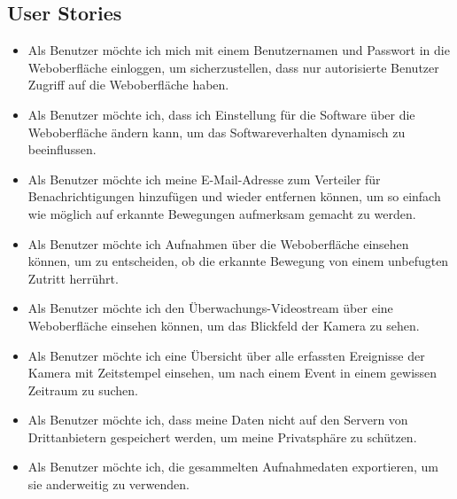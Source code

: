 \subsection{User Stories}
\begin{itemize}
\item
Als Benutzer möchte ich mich mit einem Benutzernamen und Passwort in die Weboberfläche einloggen, um sicherzustellen, dass nur autorisierte Benutzer Zugriff auf die Weboberfläche haben.
\item
Als Benutzer möchte ich, dass ich Einstellung für die Software über die Weboberfläche ändern kann, um das Softwareverhalten dynamisch zu beeinflussen.
\item
Als Benutzer möchte ich meine E-Mail-Adresse zum Verteiler für Benachrichtigungen hinzufügen und wieder entfernen können, um so einfach wie möglich auf erkannte Bewegungen aufmerksam gemacht zu werden.
\item
Als Benutzer möchte ich Aufnahmen über die Weboberfläche einsehen können, um zu entscheiden, ob die erkannte Bewegung von einem unbefugten Zutritt herrührt.
\item
Als Benutzer möchte ich den Überwachungs-Videostream über eine Weboberfläche einsehen können, um das Blickfeld der Kamera zu sehen.
\item
Als Benutzer möchte ich eine Übersicht über alle erfassten Ereignisse der Kamera mit Zeitstempel einsehen, um nach einem Event in einem gewissen Zeitraum zu suchen.
\item
Als Benutzer möchte ich, dass meine Daten nicht auf den Servern von Drittanbietern gespeichert werden, um meine Privatsphäre zu schützen.
\item
Als Benutzer möchte ich, die gesammelten Aufnahmedaten exportieren, um sie anderweitig zu verwenden.
\end{itemize}

